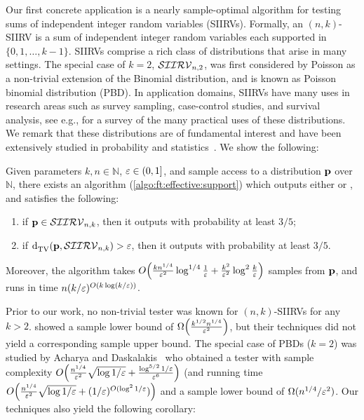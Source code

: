 Our first concrete application is a nearly sample-optimal algorithm for testing
sums of independent integer random variables (SIIRVs). 
Formally, an $(n, k)$-SIIRV is a sum of independent integer random variables each supported
in $\{0, 1, \ldots, k-1\}$.
SIIRVs comprise a rich class of distributions that arise in many settings. The special case of $k=2$, $\classksiirv[n]{2}$,
was first considered by Poisson \cite{Poisson:37} as a non-trivial extension of the Binomial distribution,
and is known as Poisson binomial distribution (PBD). In application domains, SIIRVs have many uses in research areas
such as survey sampling, case-control studies, and survival analysis, see e.g., \cite{ChenLiu:97} for a survey of the many practical uses of these distributions.
We remark that these distributions are of fundamental interest and have been extensively 
studied in probability and statistics~\cite{Chernoff:52,Hoeffding:63,DP09, Presman:83,Kruopis:86,BHJ:92, CL10,CGS11}.
We show the following:

\begin{theorem}\label{theo:testing:ksiirv}
    Given parameters $k,n\in\mathbb{N}$, $\eps\in(0,1]$, and sample access to a distribution $\p$ over $\mathbb{N}$, there exists an algorithm (\cref{algo:ft:effective:support}) which outputs either \accept or \reject, and satisfies the following:
    \begin{enumerate}
        \item if $\p \in \classksiirv[n]{k}$, then it outputs \accept with probability at least $3/5$;
        \item if $\totalvardist{\p}{\classksiirv[n]{k}}>\eps$, then it outputs \reject with probability at least $3/5$.
    \end{enumerate}
    Moreover, the algorithm takes $\bigO{\frac{k n^{1/4}}{\eps^2}\log^{1/4}\frac{1}{\eps} + \frac{k^2}{\eps^2} \log^2\frac{k}{\eps}}$ samples from $\p$, and runs in time $n(k/\eps)^{\bigO{k\log(k/\eps)}}$.
\end{theorem}

Prior to our work, no non-trivial tester was known for $(n, k)$-SIIRVs for any $k>2$. 
\cite{CDGR:16} showed a sample lower bound of $\bigOmega{\frac{k^{1/2}n^{1/4}}{\eps^2}}$, but their techniques
did not yield a corresponding sample upper bound. The special case of PBDs ($k=2$) was studied by 
Acharya and Daskalakis~\cite{AD:15} who obtained a tester with sample complexity 
$\bigO{\frac{n^{1/4}}{\eps^2}\sqrt{\log1/\eps}+\frac{\log^{5/2}1/\eps}{\eps^6}}$ (and running time $\bigO{\frac{n^{1/4}}{\eps^2}\sqrt{\log1/\eps}+(1/\eps)^{O(\log^2 1/\eps})}$ and a sample lower bound of $\Omega(n^{1/4}/\eps^2)$. 
Our techniques also yield the following corollary: 


